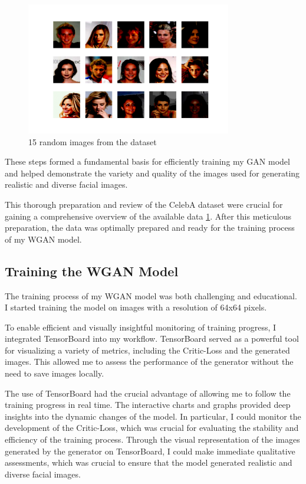 \documentclass[a4paper, 12pt]{article}
\begin{document}
\begin{figure}[ht]
\centering
\includegraphics[width=0.8\textwidth]{./img/data_faces.png}
\caption{15 random images from the dataset}
\label{fig:random_faces}
\end{figure}

These steps formed a fundamental basis for efficiently training my GAN model and helped demonstrate the variety and quality of the images used for generating realistic and diverse facial images.

This thorough preparation and review of the CelebA dataset were crucial for gaining a comprehensive overview of the available data \ref{fig:random_faces}. After this meticulous preparation, the data was optimally prepared and ready for the training process of my WGAN model.

\subsection{Training the WGAN Model}
The training process of my WGAN model was both challenging and educational. I started training the model on images with a resolution of 64x64 pixels.

To enable efficient and visually insightful monitoring of training progress, I integrated TensorBoard into my workflow. TensorBoard served as a powerful tool for visualizing a variety of metrics, including the Critic-Loss and the generated images. This allowed me to assess the performance of the generator without the need to save images locally.

The use of TensorBoard had the crucial advantage of allowing me to follow the training progress in real time. The interactive charts and graphs provided deep insights into the dynamic changes of the model. In particular, I could monitor the development of the Critic-Loss, which was crucial for evaluating the stability and efficiency of the training process. Through the visual representation of the images generated by the generator on TensorBoard, I could make immediate qualitative assessments, which was crucial to ensure that the model generated realistic and diverse facial images.
\end{document}
